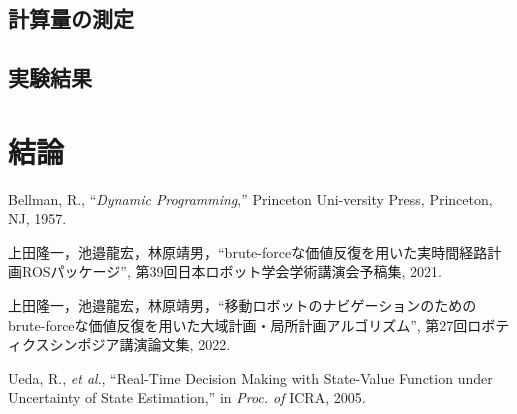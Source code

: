 \documentclass{jarticle}
\begin{document}
\subsection{計算量の測定}

\subsection{実験結果}

\section{結論}%




\footnotesize
\begin{thebibliography}{99}

	Bellman, R., ``{\it Dynamic Programming},'' Princeton Uni-versity Press, Princeton, NJ, 1957.

	上田隆一，池邉龍宏，林原靖男，``brute-forceな価値反復を用いた実時間経路計画ROSパッケージ'', 
	第39回日本ロボット学会学術講演会予稿集, 2021.

	上田隆一，池邉龍宏，林原靖男，``移動ロボットのナビゲーションのためのbrute-forceな価値反復を用いた大域計画・局所計画アルゴリズム'', 
	第27回ロボティクスシンポジア講演論文集, 2022.

	Ueda, R., {\it et al}., ``Real-Time Decision Making with State-Value Function under Uncertainty of State Estimation,''
	 in {\it Proc. of} ICRA, 2005.

\end{thebibliography}

\normalsize
\end{document}
